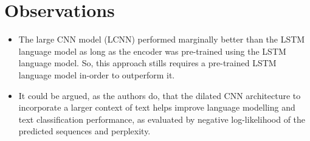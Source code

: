 \documentclass[12pt]{scrartcl}
\begin{document}
\section{Observations}
  \begin{itemize}
    \item The large CNN model (LCNN) performed marginally better than the LSTM language model as long as the encoder was pre-trained using the LSTM language model. So, this approach stills requires a pre-trained LSTM language model in-order to outperform it. 
    \item It could be argued, as the authors do, that the dilated CNN architecture to incorporate a larger context of text helps improve language modelling and text classification performance, as evaluated by negative log-likelihood of the predicted sequences and perplexity.
  \end{itemize}



\end{document}
